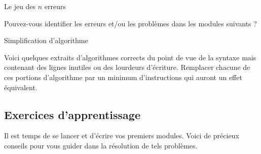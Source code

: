 \begin{Exercice}{Le jeu des $n$ erreurs}

	Pouvez-vous identifier les erreurs et/ou les
	problèmes dans les modules suivants ?



\end{Exercice}

\begin{Exercice}{Simplification d'algorithme}

	Voici quelques extraits d’algorithmes corrects du point de vue de la
	syntaxe mais contenant des lignes inutiles ou des lourdeurs d’écriture.
	Remplacer chacune de ces portions d’algorithme par un minimum
	d’instructions qui auront un effet équivalent.





\end{Exercice}

\subsection{Exercices d’apprentissage}

	Il est temps de se lancer et d'écrire vos premiers
	modules. Voici de précieux conseils pour vous guider dans la résolution
	de tels problèmes.

